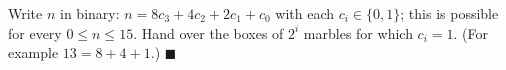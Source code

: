 Write $n$ in binary: $n=8c_3+4c_2+2c_1+c_0$ with each $c_i\in\{0,1\}$; this is possible for every $0\le n\le15$. Hand over the boxes of $2^i$ marbles for which $c_i=1$. (For example $13=8+4+1$.) $\blacksquare$
